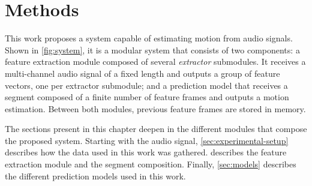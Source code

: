 \section{Methods} \label{chap:methods}

This work proposes a system capable of estimating motion from audio signals.
Shown in \cref{fig:system}, it is a modular system that consists of two
components: a feature extraction module composed of several \emph{extractor}
submodules. It receives a multi-channel audio signal of a fixed length and
outputs a group of feature vectors, one per extractor submodule; and a
prediction model that receives a segment composed of a finite number of feature
frames and outputs a motion estimation. Between both modules, previous feature
frames are stored in memory.

The sections present in this chapter deepen in the different modules that
compose the proposed system. Starting with the audio signal,
\cref{sec:experimental-setup} describes how the data used in this work was
gathered.  describes the feature extraction module and the
segment composition. Finally, \cref{sec:models} describes the different
prediction models used in this work.





